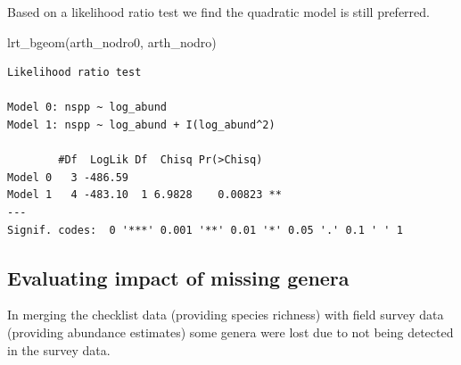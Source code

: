 \documentclass[
  letterpaper,
  DIV=11,
  numbers=noendperiod]{scrartcl}
\newenvironment{Shaded}{\begin{snugshade}}{\end{snugshade}}
\newcommand{\AttributeTok}[1]{\textcolor[rgb]{0.40,0.45,0.13}{#1}}
\newcommand{\CommentTok}[1]{\textcolor[rgb]{0.37,0.37,0.37}{#1}}
\newcommand{\DecValTok}[1]{\textcolor[rgb]{0.68,0.00,0.00}{#1}}
\newcommand{\FunctionTok}[1]{\textcolor[rgb]{0.28,0.35,0.67}{#1}}
\newcommand{\NormalTok}[1]{\textcolor[rgb]{0.00,0.23,0.31}{#1}}
\newcommand{\OtherTok}[1]{\textcolor[rgb]{0.00,0.23,0.31}{#1}}
\newcommand{\SpecialCharTok}[1]{\textcolor[rgb]{0.37,0.37,0.37}{#1}}
\newcommand{\StringTok}[1]{\textcolor[rgb]{0.13,0.47,0.30}{#1}}
\begin{document}
\begin{Shaded}
\end{Shaded}

Based on a likelihood ratio test we find the quadratic model is still
preferred.

\begin{Shaded}
\begin{Highlighting}[]
\FunctionTok{lrt\_bgeom}\NormalTok{(arth\_nodro0, arth\_nodro)}
\end{Highlighting}
\end{Shaded}

\begin{verbatim}
Likelihood ratio test

Model 0: nspp ~ log_abund
Model 1: nspp ~ log_abund + I(log_abund^2)

        #Df  LogLik Df  Chisq Pr(>Chisq)   
Model 0   3 -486.59                        
Model 1   4 -483.10  1 6.9828    0.00823 **
---
Signif. codes:  0 '***' 0.001 '**' 0.01 '*' 0.05 '.' 0.1 ' ' 1
\end{verbatim}

\subsection{Evaluating impact of missing genera}\label{sec-miss-gen}

In merging the checklist data (providing species richness) with field
survey data (providing abundance estimates) some genera were lost due to
not being detected in the survey data.

\begin{Shaded}
\end{Shaded}
\end{document}
